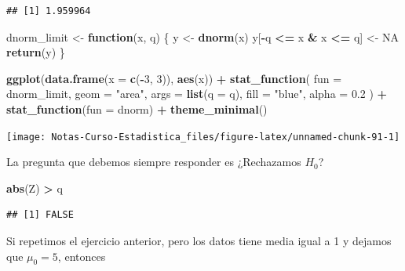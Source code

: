 \documentclass[
  12pt,
]{book}
\newenvironment{Shaded}{\begin{snugshade}}{\end{snugshade}}
\newcommand{\ControlFlowTok}[1]{\textcolor[rgb]{0.13,0.29,0.53}{\textbf{#1}}}
\newcommand{\DataTypeTok}[1]{\textcolor[rgb]{0.13,0.29,0.53}{#1}}
\newcommand{\DecValTok}[1]{\textcolor[rgb]{0.00,0.00,0.81}{#1}}
\newcommand{\FloatTok}[1]{\textcolor[rgb]{0.00,0.00,0.81}{#1}}
\newcommand{\KeywordTok}[1]{\textcolor[rgb]{0.13,0.29,0.53}{\textbf{#1}}}
\newcommand{\NormalTok}[1]{#1}
\newcommand{\OperatorTok}[1]{\textcolor[rgb]{0.81,0.36,0.00}{\textbf{#1}}}
\newcommand{\OtherTok}[1]{\textcolor[rgb]{0.56,0.35,0.01}{#1}}
\newcommand{\StringTok}[1]{\textcolor[rgb]{0.31,0.60,0.02}{#1}}
\begin{document}
\begin{verbatim}
## [1] 1.959964
\end{verbatim}

\begin{Shaded}
\begin{Highlighting}[]
\NormalTok{dnorm\_limit \textless{}{-}}\StringTok{ }\ControlFlowTok{function}\NormalTok{(x, q) \{}
\NormalTok{  y \textless{}{-}}\StringTok{ }\KeywordTok{dnorm}\NormalTok{(x)}
\NormalTok{  y[}\OperatorTok{{-}}\NormalTok{q }\OperatorTok{\textless{}=}\StringTok{ }\NormalTok{x }\OperatorTok{\&}\StringTok{ }\NormalTok{x }\OperatorTok{\textless{}=}\StringTok{ }\NormalTok{q] \textless{}{-}}\StringTok{ }\OtherTok{NA}
  \KeywordTok{return}\NormalTok{(y)}
\NormalTok{\}}

\KeywordTok{ggplot}\NormalTok{(}\KeywordTok{data.frame}\NormalTok{(}\DataTypeTok{x =} \KeywordTok{c}\NormalTok{(}\OperatorTok{{-}}\DecValTok{3}\NormalTok{, }\DecValTok{3}\NormalTok{)), }\KeywordTok{aes}\NormalTok{(x)) }\OperatorTok{+}
\StringTok{  }\KeywordTok{stat\_function}\NormalTok{(}
    \DataTypeTok{fun =}\NormalTok{ dnorm\_limit, }\DataTypeTok{geom =} \StringTok{"area"}\NormalTok{, }\DataTypeTok{args =} \KeywordTok{list}\NormalTok{(}\DataTypeTok{q =}\NormalTok{ q),}
    \DataTypeTok{fill =} \StringTok{"blue"}\NormalTok{, }\DataTypeTok{alpha =} \FloatTok{0.2}
\NormalTok{  ) }\OperatorTok{+}
\StringTok{  }\KeywordTok{stat\_function}\NormalTok{(}\DataTypeTok{fun =}\NormalTok{ dnorm) }\OperatorTok{+}
\StringTok{  }\KeywordTok{theme\_minimal}\NormalTok{()}
\end{Highlighting}
\end{Shaded}

\begin{center}\texttt{[image: Notas-Curso-Estadistica\_files/figure-latex/unnamed-chunk-91-1]} \end{center}

La pregunta que debemos siempre responder es ¿Rechazamos \(H_0\)?

\begin{Shaded}
\begin{Highlighting}[]
\KeywordTok{abs}\NormalTok{(Z) }\OperatorTok{\textgreater{}}\StringTok{ }\NormalTok{q}
\end{Highlighting}
\end{Shaded}

\begin{verbatim}
## [1] FALSE
\end{verbatim}

Si repetimos el ejercicio anterior, pero los datos tiene media igual a 1 y
dejamos que \(\mu_0 = 5\), entonces
\end{document}

